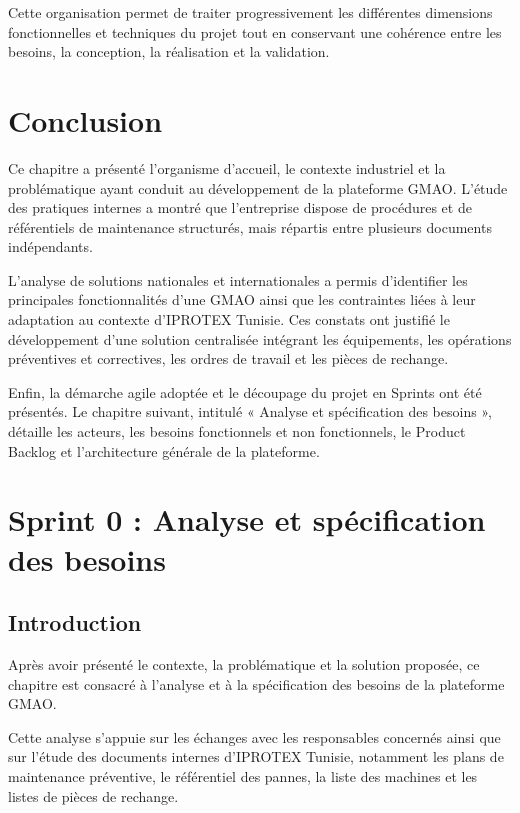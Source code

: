 Cette organisation permet de traiter progressivement les différentes dimensions fonctionnelles et techniques du projet tout en conservant une cohérence entre les besoins, la conception, la réalisation et la validation.

\section*{Conclusion}

Ce chapitre a présenté l’organisme d’accueil, le contexte industriel et la problématique ayant conduit au développement de la plateforme GMAO. L’étude des pratiques internes a montré que l’entreprise dispose de procédures et de référentiels de maintenance structurés, mais répartis entre plusieurs documents indépendants.

L’analyse de solutions nationales et internationales a permis d’identifier les principales fonctionnalités d’une GMAO ainsi que les contraintes liées à leur adaptation au contexte d’IPROTEX Tunisie. Ces constats ont justifié le développement d’une solution centralisée intégrant les équipements, les opérations préventives et correctives, les ordres de travail et les pièces de rechange.

Enfin, la démarche agile adoptée et le découpage du projet en Sprints ont été présentés. Le chapitre suivant, intitulé « Analyse et spécification des besoins », détaille les acteurs, les besoins fonctionnels et non fonctionnels, le Product Backlog et l’architecture générale de la plateforme.

\clearpage

\section{Sprint 0 : Analyse et spécification des besoins}

\subsection{Introduction}

Après avoir présenté le contexte, la problématique et la solution proposée, ce chapitre est consacré à l’analyse et à la spécification des besoins de la plateforme GMAO.

Cette analyse s’appuie sur les échanges avec les responsables concernés ainsi que sur l’étude des documents internes d’IPROTEX Tunisie, notamment les plans de maintenance préventive, le référentiel des pannes, la liste des machines et les listes de pièces de rechange.

